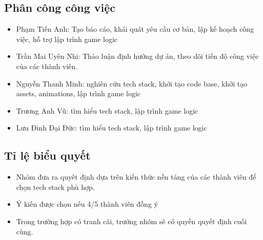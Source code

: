 \documentclass[a4paper, 12pt]{article}
\begin{document}
\subsection{Phân công công việc}
\begin{itemize}
    \item Phạm Tiến Anh: Tạo báo cáo, khái quát yêu cầu cơ bản, lập kế hoạch công việc, hỗ trợ lập trình game logic
    \item Trần Mai Uyên Nhi: Thảo luận định hướng dự án, theo dõi tiến độ công việc của các thành viên.
    \item Nguyễn Thanh Minh: nghiên cứu tech stack, khởi tạo code base, khởi tạo assets, animations, lập trình game logic
    \item Trương Anh Vũ: tìm hiểu tech stack, lập trình game logic
    \item Lưu Đinh Đại Đức: tìm hiểu tech stack, lập trình game logic
\end{itemize}

\subsection{Tỉ lệ biểu quyết}
\begin{itemize}
    \item Nhóm đưa ra quyết định dựa trên kiến thức nền tảng của các thành viên để chọn tech stack phù hợp.
    \item Ý kiến được chọn nếu 4/5 thành viên đồng ý
    \item Trong trường hợp có tranh cãi, trưởng nhóm sẽ có quyền quyết định cuối cùng.
\end{itemize}
\end{document}
